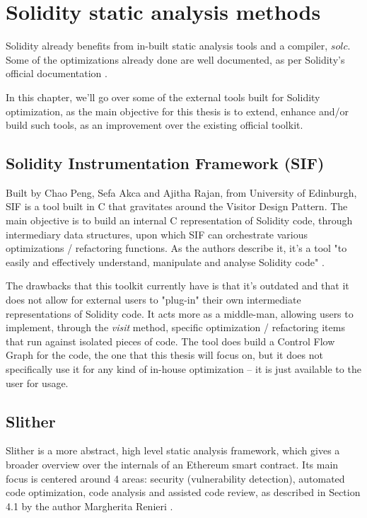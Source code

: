 \chapter{Solidity static analysis methods}

Solidity already benefits from in-built static analysis tools and a compiler, ${solc}$. Some of the optimizations already done are well documented, as per Solidity's official documentation \cite{solidity-documentation}.

In this chapter, we'll go over some of the external tools built for Solidity optimization, as the main objective for this thesis is to extend, enhance and/or build such tools, as an improvement over the existing official toolkit.

\section{Solidity Instrumentation Framework (SIF)}

Built by Chao Peng, Sefa Akca and Ajitha Rajan, from University of Edinburgh, SIF is a tool built in C that gravitates around the Visitor Design Pattern. The main objective is to build an internal C representation of Solidity code, through intermediary data structures, upon which SIF can orchestrate various optimizations / refactoring functions. As the authors describe it, it's a tool "to easily and effectively understand, manipulate and analyse Solidity code" \cite{sif}.

The drawbacks that this toolkit currently have is that it's outdated and that it does not allow for external users to "plug-in" their own intermediate representations of Solidity code. It acts more as a middle-man, allowing users to implement, through the \emph{visit} method, specific optimization / refactoring items that run against isolated pieces of code. The tool does build a Control Flow Graph for the code, the one that this thesis will focus on, but it does not specifically use it for any kind of in-house optimization – it is just available to the user for usage.

\section{Slither}

Slither is a more abstract, high level static analysis framework, which gives a broader overview over the internals of an Ethereum smart contract. Its main focus is centered around 4 areas: security (vulnerability detection), automated code optimization, code analysis and assisted code review, as described in Section 4.1 by the author Margherita Renieri \cite{slither}.

